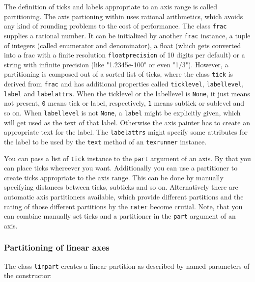 The definition of ticks and labels appropriate to an axis range is
called partitioning. The axis partioning within \PyX{} uses rational
arithmetics, which avoids any kind of rounding problems to the cost of
performance. The class \verb|frac| supplies a rational number. It can
be initialized by another \verb|frac| instance, a tuple of integers
(called enumerator and denominator), a float (which gets converted
into a frac with a finite resolution \verb|floatprecision| of 10
digits per default) or a string with infinite precision (like
"1.2345e-100" or even "1/3"). However, a partitioning is composed out
of a sorted list of ticks, where the class \verb|tick| is derived from
\verb|frac| and has additional properties called \verb|ticklevel|,
\verb|labellevel|, \verb|label| and \verb|labelattrs|. When the
ticklevel or the labellevel is \verb|None|, it just means not present,
\verb|0| means tick or label, respectively, \verb|1| means subtick or
sublevel and so on. When \verb|labellevel| is not \verb|None|, a
\verb|label| might be explicitly given, which will get used as the
text of that label. Otherwise the axis painter has to create an
appropriate text for the label. The \verb|labelattrs| might specify
some attributes for the label to be used by the \verb|text| method of
an \verb|texrunner| instance.

You can pass a list of \verb|tick| instance to the \verb|part|
argument of an axis. By that you can place ticks whereever you want.
Additionally you can use a partitioner to create ticks appropriate to
the axis range. This can be done by manually specifying distances
between ticks, subticks and so on. Alternatively there are automatic
axis partitioners available, which provide different partitions and
the rating of those different partitions by the \verb|rater| become
crutial. Note, that you can combine manually set ticks and a
partitioner in the \verb|part| argument of an axis.

\subsubsection{Partitioning of linear axes}

The class \verb|linpart| creates a linear partition as described by
named parameters of the constructor:

